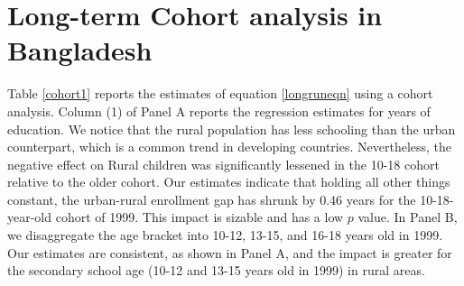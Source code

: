 \documentclass[12pt,letterpaper]{article}
\newcommand{\0}{\ensuremath{\mbox{\boldmath $0$}}}
\begin{document}
\section{Long-term Cohort analysis in Bangladesh\label{sec.long-term}}


Table \ref{cohort1} reports the estimates of equation \eqref{longruneqn} using a cohort analysis. Column (1) of Panel A reports the regression estimates for years of education. We notice that the rural population has less schooling than the urban counterpart, which is a common trend in developing countries. Nevertheless, the negative effect on Rural children was significantly lessened in the 10-18 cohort relative to the older cohort. Our estimates indicate that holding all other things constant, the urban-rural enrollment gap has shrunk by 0.46 years for the 10-18-year-old cohort of 1999. This impact is sizable and has a low $p$ value. In Panel B, we disaggregate the age bracket into 10-12, 13-15, and 16-18 years old in 1999. Our estimates are consistent, as shown in Panel A, and the impact is greater for the secondary school age (10-12 and 13-15 years old in 1999) in rural areas. 
\end{document}
